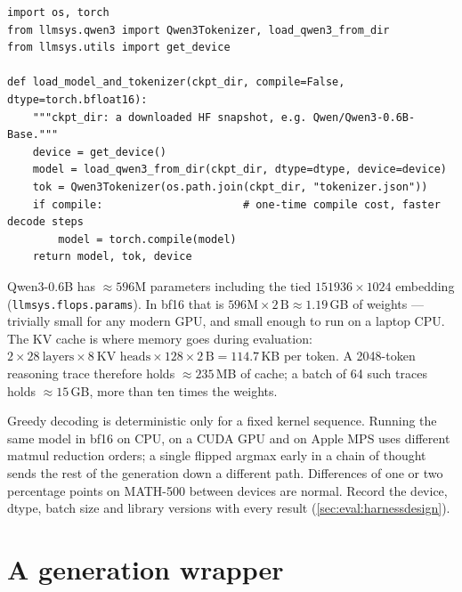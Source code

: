 \begin{lstlisting}[caption={Loading the model under test (see \texttt{labs/lab14\_eval/run.py}).},label={lst:eval:load}]
import os, torch
from llmsys.qwen3 import Qwen3Tokenizer, load_qwen3_from_dir
from llmsys.utils import get_device

def load_model_and_tokenizer(ckpt_dir, compile=False, dtype=torch.bfloat16):
    """ckpt_dir: a downloaded HF snapshot, e.g. Qwen/Qwen3-0.6B-Base."""
    device = get_device()
    model = load_qwen3_from_dir(ckpt_dir, dtype=dtype, device=device)
    tok = Qwen3Tokenizer(os.path.join(ckpt_dir, "tokenizer.json"))
    if compile:                      # one-time compile cost, faster decode steps
        model = torch.compile(model)
    return model, tok, device
\end{lstlisting}

\begin{napkinmath}
Qwen3-0.6B has $\approx\num{596}$M parameters including the tied $\num{151936}\times1024$
embedding (\texttt{llmsys.flops.params}). In bf16 that is $596\text{M}\times 2\,\text{B}
\approx 1.19$\,GB of weights --- trivially small for any modern GPU, and small enough to run on a
laptop CPU. The KV cache is where memory goes during evaluation: $2 \times 28\ \text{layers}
\times 8\ \text{KV heads} \times 128 \times 2\,\text{B} = 114.7$\,KB per token. A 2048-token
reasoning trace therefore holds $\approx 235$\,MB of cache; a batch of 64 such traces holds
$\approx 15$\,GB, more than ten times the weights.
\end{napkinmath}

\begin{pitfall}
Greedy decoding is deterministic only for a fixed kernel sequence. Running the same model in bf16
on CPU, on a CUDA GPU and on Apple MPS uses different matmul reduction orders; a single flipped
argmax early in a chain of thought sends the rest of the generation down a different path.
Differences of one or two percentage points on MATH-500 between devices are normal. Record the
device, dtype, batch size and library versions with every result
(\cref{sec:eval:harnessdesign}).
\end{pitfall}

\section{A generation wrapper}\label{sec:eval:wrapper}

